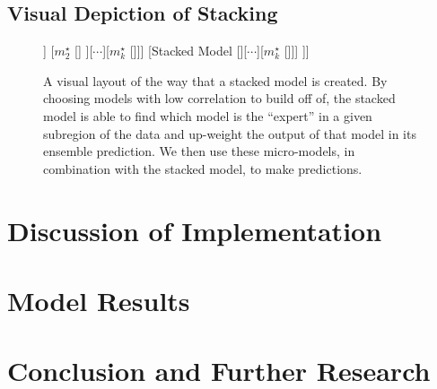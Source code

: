 \documentclass[10pt,a4paper, hidelinks]{article} %
\begin{document}
\subsection{Visual Depiction of Stacking}
\begin{figure}[H]
	\centering
	\begin{forest}
		[Final Predictions [\dattestpreds [\dattest] [$m^\star_1$ [\dattrain]] [$m^\star_2$ [\dattrain] ][$\cdots$][$m^\star_k$ [\dattrain]]] [Stacked Model [\datvaltest [\datval] [$m^\star_1$ [\dattrain]][$\cdots$][$m^\star_k$ [\dattrain]]] ]]
	\end{forest}
\caption{A visual layout of the way that a stacked model is created. By choosing models with low correlation to build off of, the stacked model is able to find which model is the ``expert'' in a given subregion of the data and up-weight the output of that model in its ensemble prediction. We then use these micro-models, in combination with the stacked model, to make predictions. }
\end{figure}



\section{Discussion of Implementation}

\section{Model Results}

\section{Conclusion and Further Research}
\end{document}
